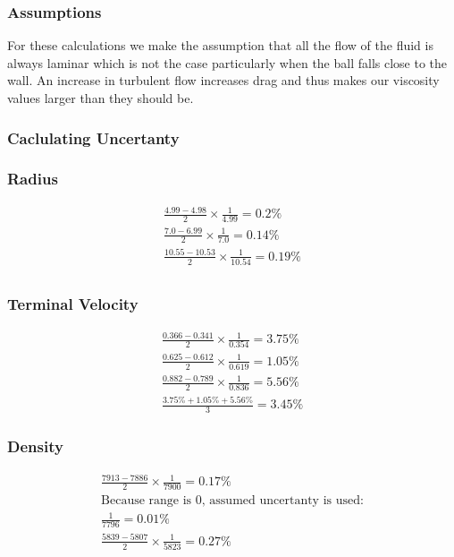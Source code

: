 \documentclass{article}
\begin{document}
\subsubsection{Assumptions}
For these calculations we make the assumption that all the flow of the fluid is always laminar which is
not the case particularly when the ball falls close to the wall. An increase in turbulent flow increases
drag and thus makes our viscosity values larger than they should be.

\subsubsection{Caclulating Uncertanty}

\subsubsection*{Radius}

\begin{gather}
	\frac{4.99 - 4.98}{2} \times \frac{1}{4.99} = 0.2 \% \\
	\frac{7.0 - 6.99}{2} \times \frac{1}{7.0} = 0.14 \% \\
	\frac{10.55 - 10.53}{2} \times \frac{1}{10.54} = 0.19 \% \\
\end{gather}

\subsubsection*{Terminal Velocity}

\begin{gather}
	\frac{0.366 - 0.341}{2} \times \frac{1}{0.354} = 3.75 \% \\
	\frac{0.625 - 0.612}{2} \times \frac{1}{0.619} = 1.05 \% \\
	\frac{0.882 - 0.789}{2} \times \frac{1}{0.836} = 5.56 \% \\
	\frac{3.75\% + 1.05\% + 5.56\%}{3} = 3.45\%
\end{gather}

\subsubsection*{Density}

\begin{gather}
	\frac{7913 - 7886}{2} \times \frac{1}{7900} = 0.17\% \\
	\text{Because range is 0, assumed uncertanty is used:} \\
	\frac{1}{7796} = 0.01\% \\
	\frac{5839 - 5807}{2} \times \frac{1}{5823} = 0.27\%
\end{gather}
\end{document}
